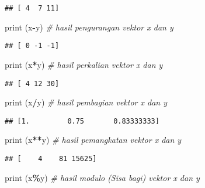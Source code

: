 \documentclass[
]{docs}
\newenvironment{Shaded}{\begin{snugshade}}{\end{snugshade}}
\newcommand{\BuiltInTok}[1]{#1}
\newcommand{\CommentTok}[1]{\textcolor[rgb]{0.56,0.35,0.01}{\textit{#1}}}
\newcommand{\NormalTok}[1]{#1}
\newcommand{\OperatorTok}[1]{\textcolor[rgb]{0.81,0.36,0.00}{\textbf{#1}}}
\begin{document}
\begin{verbatim}
## [ 4  7 11]
\end{verbatim}

\begin{Shaded}
\begin{Highlighting}[]
\BuiltInTok{print}\NormalTok{ (x}\OperatorTok{{-}}\NormalTok{y)             }\CommentTok{\# hasil pengurangan vektor x dan y}
\end{Highlighting}
\end{Shaded}

\begin{verbatim}
## [ 0 -1 -1]
\end{verbatim}

\begin{Shaded}
\begin{Highlighting}[]
\BuiltInTok{print}\NormalTok{ (x}\OperatorTok{*}\NormalTok{y)             }\CommentTok{\# hasil perkalian vektor x dan y}
\end{Highlighting}
\end{Shaded}

\begin{verbatim}
## [ 4 12 30]
\end{verbatim}

\begin{Shaded}
\begin{Highlighting}[]
\BuiltInTok{print}\NormalTok{ (x}\OperatorTok{/}\NormalTok{y)             }\CommentTok{\# hasil pembagian vektor x dan y}
\end{Highlighting}
\end{Shaded}

\begin{verbatim}
## [1.         0.75       0.83333333]
\end{verbatim}

\begin{Shaded}
\begin{Highlighting}[]
\BuiltInTok{print}\NormalTok{ (x}\OperatorTok{**}\NormalTok{y)            }\CommentTok{\# hasil pemangkatan vektor x dan y}
\end{Highlighting}
\end{Shaded}

\begin{verbatim}
## [    4    81 15625]
\end{verbatim}

\begin{Shaded}
\begin{Highlighting}[]
\BuiltInTok{print}\NormalTok{ (x}\OperatorTok{\%}\NormalTok{y)             }\CommentTok{\# hasil modulo (Sisa bagi) vektor x dan y}
\end{Highlighting}
\end{Shaded}
\end{document}
